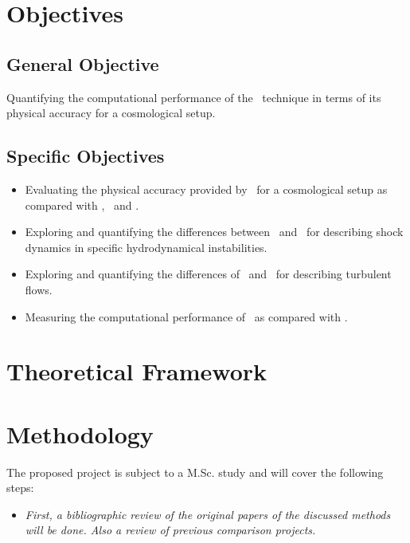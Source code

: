 \documentclass[a4,useAMS,usenatbib,usegraphicx,12pt]{article}
\begin{document}
\section{Objectives}
\subsection*{General Objective}
Quantifying the computational performance of the \VPH\ technique in terms of 
its physical accuracy for a cosmological setup.


\subsection*{Specific Objectives}
\begin{itemize}
\item Evaluating the physical accuracy provided by \VPH\ for a cosmological 
setup as compared with \AMR, \SPH\ and \AREPO.
\item Exploring and quantifying the differences between \VPH\ and \AMR\ for 
describing shock dynamics in specific hydrodynamical instabilities.
\item Exploring and quantifying the differences of \VPH\ and \SPH\ for 
describing turbulent flows.
\item Measuring the computational performance of \VPH\ as compared with \AREPO.
\end{itemize}


\section{Theoretical Framework}


\section{Methodology}
The proposed project is subject to a M.Sc. study and will cover the following 
steps:


\begin{itemize}
\item[\checkmark] \textit{First, a bibliographic review of the original papers 
of the discussed methods will be done. Also a review of previous comparison 
projects.}
\end{itemize}
\end{document}
